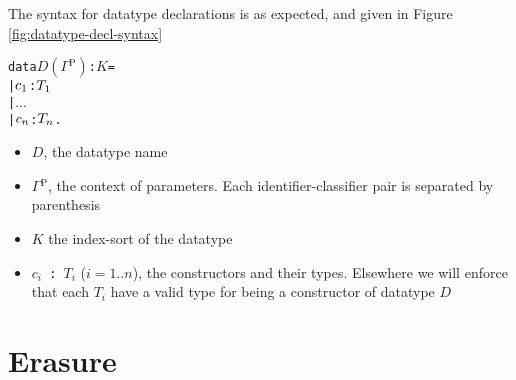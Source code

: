 \documentclass{article}
\newcommand{\splab}[1]{\ensuremath{^{\text{#1}}}}
\begin{document}
The syntax for datatype declarations is as expected, and given in Figure \ref{fig:datatype-decl-syntax}
\begin{alltt}
data \(D\) \((\Gamma\splab{P})\): \(K\) =
  | \(c\sb{1}\) : \(T\sb{1}\)
  | \(...\)
  | \(c\sb{n}\) : \(T\sb{n}\).
\end{alltt}
\begin{itemize}
\item $D$, the datatype name
\item $\Gamma\splab{P}$, the context of parameters. Each identifier-classifier
  pair is separated by parenthesis
\item $K$ the index-sort of the datatype
\item \texttt{$c_i$ : $T_i$} ($i=1..n$), the constructors and their types. Elsewhere we will
  enforce that each $T_i$ have a valid type for being a constructor of datatype $D$
\end{itemize}

\newpage
\section{Erasure}
\end{document}
